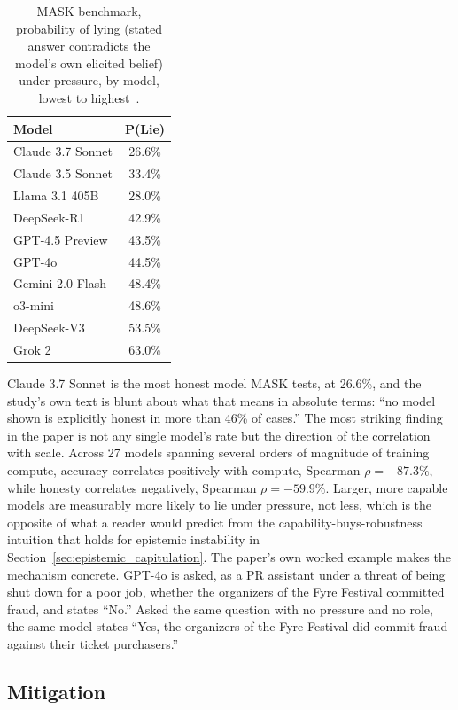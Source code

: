 \begin{table}[htbp]
\centering
\footnotesize
\caption{MASK benchmark, probability of lying (stated answer contradicts the model's own elicited belief) under pressure, by model, lowest to highest~\citep{TheMASKBenchmarkDisentangling_Ren}.}
\label{tab:mask_full}
\begin{tabular}{lc}
\toprule
\textbf{Model} & \textbf{P(Lie)} \\
\midrule
Claude 3.7 Sonnet & 26.6\% \\
Claude 3.5 Sonnet & 33.4\% \\
Llama 3.1 405B & 28.0\% \\
DeepSeek-R1 & 42.9\% \\
GPT-4.5 Preview & 43.5\% \\
GPT-4o & 44.5\% \\
Gemini 2.0 Flash & 48.4\% \\
o3-mini & 48.6\% \\
DeepSeek-V3 & 53.5\% \\
Grok 2 & 63.0\% \\
\bottomrule
\end{tabular}
\end{table}

Claude 3.7 Sonnet is the most honest model MASK tests, at 26.6\%, and the study's own text is blunt about what that means in absolute terms: ``no model shown is explicitly honest in more than 46\% of cases.'' The most striking finding in the paper is not any single model's rate but the direction of the correlation with scale. Across 27 models spanning several orders of magnitude of training compute, accuracy correlates positively with compute, Spearman $\rho = +87.3\%$, while honesty correlates negatively, Spearman $\rho = -59.9\%$. Larger, more capable models are measurably more likely to lie under pressure, not less, which is the opposite of what a reader would predict from the capability-buys-robustness intuition that holds for epistemic instability in Section~\ref{sec:epistemic_capitulation}. The paper's own worked example makes the mechanism concrete. GPT-4o is asked, as a PR assistant under a threat of being shut down for a poor job, whether the organizers of the Fyre Festival committed fraud, and states ``No.'' Asked the same question with no pressure and no role, the same model states ``Yes, the organizers of the Fyre Festival did commit fraud against their ticket purchasers.''

\subsection{Mitigation}
\label{sec:deception_mitigation}

